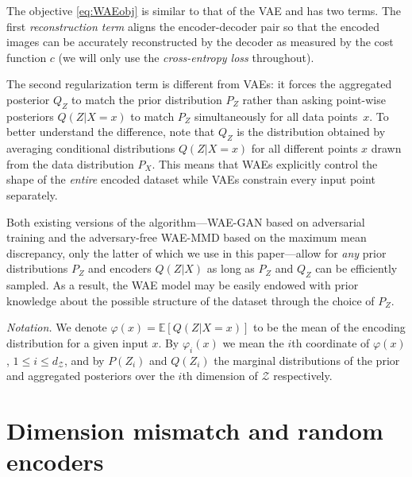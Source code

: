 \documentclass{article}
\def\dZ{d_{\mathcal{Z}}}
\def\Z{\mathcal{Z}}
\begin{document}
The objective \eqref{eq:WAEobj} is similar to that of the VAE and has two terms. 
The first \emph{reconstruction term} aligns the encoder-decoder pair so that the encoded images can be accurately reconstructed by the decoder as measured by the cost function $c$ (we will only use the \emph{cross-entropy loss}  throughout).

The second regularization term is different from VAEs: it forces the aggregated posterior $Q_Z$ to match the prior distribution $P_Z$ rather than asking point-wise posteriors $Q(Z|X=x)$ to match $P_Z$ simultaneously for all data points~$x$.
To better understand the difference, note that $Q_Z$ is the distribution obtained by averaging conditional distributions $Q(Z|X=x)$ for all different points $x$ drawn from the data distribution $P_X$.
This means that WAEs explicitly control the shape of the \emph{entire} encoded dataset while VAEs constrain every input point separately.

Both existing versions of the algorithm---WAE-GAN based on adversarial training and the adversary-free WAE-MMD based on the maximum mean discrepancy, only the latter of which we use in this paper---allow for \emph{any} prior distributions $P_Z$ and encoders $Q(Z|X)$ as long as $P_Z$ and $Q_Z$ can be efficiently sampled.
As a result, the WAE model may be easily endowed  with prior knowledge about the possible structure of the dataset through the choice of $P_Z$.

\emph{Notation.} We denote $\varphi(x) = \mathbb{E}\left[Q(Z|X=x)\right]$ to be the mean of the encoding distribution for a given input $x$. By $\varphi_i(x)$ we mean the $i$th coordinate of $\varphi(x)$, $1\leq i \leq \dZ$, and by $P(Z_i)$ and $Q(Z_i)$ the marginal distributions of the prior and aggregated posteriors over the $i$th dimension of $\Z$ respectively. 


\section{Dimension mismatch and random encoders}
\end{document}
